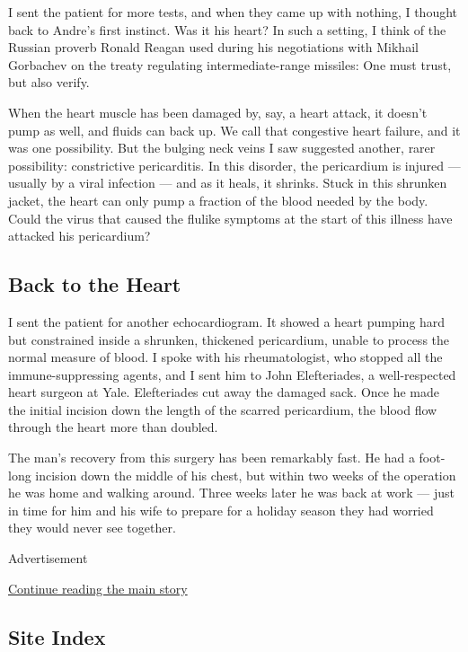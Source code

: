 I sent the patient for more tests, and when they came up with nothing, I
thought back to Andre's first instinct. Was it his heart? In such a
setting, I think of the Russian proverb Ronald Reagan used during his
negotiations with Mikhail Gorbachev on the treaty regulating
intermediate-range missiles: One must trust, but also verify.

When the heart muscle has been damaged by, say, a heart attack, it
doesn't pump as well, and fluids can back up. We call that congestive
heart failure, and it was one possibility. But the bulging neck veins I
saw suggested another, rarer possibility: constrictive pericarditis. In
this disorder, the pericardium is injured --- usually by a viral
infection --- and as it heals, it shrinks. Stuck in this shrunken
jacket, the heart can only pump a fraction of the blood needed by the
body. Could the virus that caused the flulike symptoms at the start of
this illness have attacked his pericardium?

\hypertarget{back-to-the-heart}{%
\subsection{\texorpdfstring{\textbf{Back to the
Heart}}{Back to the Heart}}\label{back-to-the-heart}}

I sent the patient for another echocardiogram. It showed a heart pumping
hard but constrained inside a shrunken, thickened pericardium, unable to
process the normal measure of blood. I spoke with his rheumatologist,
who stopped all the immune-suppressing agents, and I sent him to John
Elefteriades, a well-respected heart surgeon at Yale. Elefteriades cut
away the damaged sack. Once he made the initial incision down the length
of the scarred pericardium, the blood flow through the heart more than
doubled.

The man's recovery from this surgery has been remarkably fast. He had a
foot-long incision down the middle of his chest, but within two weeks of
the operation he was home and walking around. Three weeks later he was
back at work --- just in time for him and his wife to prepare for a
holiday season they had worried they would never see together.

Advertisement

\protect\hyperlink{after-bottom}{Continue reading the main story}

\hypertarget{site-index}{%
\subsection{Site Index}\label{site-index}}

